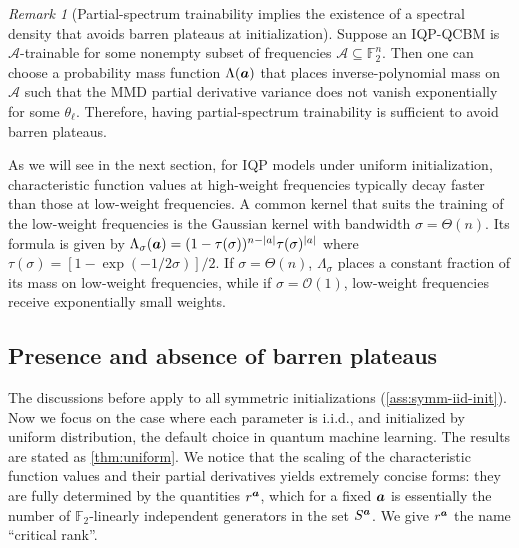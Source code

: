 \documentclass{article}
\theoremstyle{plain}
\theoremstyle{definition}
\theoremstyle{remark}
\newtheorem{remark}[theorem]{Remark}
\begin{document}
\begin{remark}[Partial-spectrum trainability implies the existence of a spectral density that avoids barren plateaus at initialization] Suppose an IQP-QCBM is $\mathcal{A}$-trainable for some nonempty subset of frequencies $\mathcal{A} \subseteq \mathbb{F}_2^n$. Then one can choose a probability mass function $\Lambda({\bm{a}})$ that places inverse-polynomial mass on $\mathcal{A}$ such that the MMD partial derivative variance does not vanish exponentially for some $\theta_\ell$. Therefore, having partial-spectrum trainability is sufficient to avoid barren plateaus. 
\end{remark}

As we will see in the next section, for IQP models under uniform initialization, characteristic function values at high-weight frequencies typically decay faster than those at low-weight frequencies. A common kernel that suits the training of the low-weight frequencies is the Gaussian kernel with bandwidth $\sigma=\Theta(n)$. Its formula is given by $\Lambda_\sigma({\bm{a}}) = (1-\tau(\sigma))^{n-\abs{a}} \tau(\sigma)^\abs{a}$ where $\tau(\sigma) = [1-\exp(-1/2 \sigma)]/2$. If $\sigma=\Theta(n)$, $\Lambda_\sigma$ places a constant fraction of its mass on low-weight frequencies, while if $\sigma=\mathcal{O}(1)$, low-weight frequencies receive exponentially small weights.

\subsection{Presence and absence of barren plateaus} \label{subsec:uniform}
The discussions before apply to all symmetric initializations (\cref{ass:symm-iid-init}). Now we focus on the case where each parameter is i.i.d., and initialized by uniform distribution, the default choice in quantum machine learning. The results are stated as \cref{thm:uniform}. We notice that the scaling of the characteristic function values and their partial derivatives yields extremely concise forms: they are fully determined by the quantities $r^{\bm{a}}$, which for a fixed ${\bm{a}}$ is essentially the number of $\mathbb{F}_2$-linearly independent generators in the set $S^{\bm{a}}$. We give $r^{\bm{a}}$ the name ``critical rank''.
\end{document}
